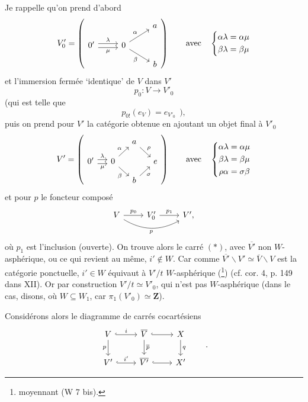 \documentclass[11pt]{article}
\newcommand{\printedpage}[1]{\marginpar{\footnotesize p.~#1}}
\newcommand{\msp}[1]{\marginpar{\footnotesize [#1]}}
\begin{document}
Je rappelle qu'on prend d'abord
\printedpage{11}
\[
V'_0 = \left(
\begin{tikzcd}[row sep=small]
 & & a \\
0' \arrow[r, shift left, "\lambda"] \arrow[r, shift right, "\mu"'] & 0 \arrow[ur, "\alpha"] \arrow[dr, "\beta"'] & \\
 & & b
\end{tikzcd}
\right)
\qquad \text{avec} \quad
\left\{
\begin{aligned}
\alpha\lambda &= \alpha\mu \\
\beta\lambda &= \beta\mu
\end{aligned}
\right.
\]
et l'immersion fermée ‘identique’ de $V$ dans $V'$
\[ p_0 : V \longrightarrow V'_0 \]
\msp{page 15}(qui est telle que
\[ p_{0!}(e_V) = e_{V'_0} \ \ ), \]
puis on prend pour $V'$ la catégorie obtenue en ajoutant un objet final à $V'_0$
\[
V' = \left(
\begin{tikzcd}[row sep=small, column sep=small]
 & & a \arrow[dr, "\rho"] & \\
0' \arrow[r, shift left, "\lambda"] \arrow[r, shift right, "\mu"'] & 0 \arrow[ur, "\alpha"] \arrow[dr, "\beta"'] & & e \\
 & & b \arrow[ur, "\sigma"'] &
\end{tikzcd}
\right)
\qquad \text{avec} \quad
\left\{
\begin{aligned}
\alpha\lambda &= \alpha\mu \\
\beta\lambda &= \beta\mu \\
\rho\alpha &= \sigma\beta
\end{aligned}
\right.
\]
et pour $p$ le foncteur composé
\[
\begin{tikzcd}
V \arrow[r, "p_0"] \arrow[rr, bend right, "p"'] & V'_0 \arrow[r, "p_1"] & V',
\end{tikzcd}
\]
où $p_1$ est l'inclusion (ouverte). On trouve alors le carré $(*)$, avec $\overline{V'}$ non $W$-asphérique, ou ce qui revient au même, $i' \notin W$. Car comme $\overline{V'}\backslash V' \simeq \overline{V}\backslash V$ est la catégorie ponctuelle, $i' \in W$ équivaut à $V'/t$ $W$-asphérique (\footnote[8]{moyennant (W 7 bis).}) (cf. cor. 4, p. 149 dans XII). Or par construction $V'/t \simeq V'_0$, qui n'est pas $W$-asphérique (dans le cas, disons, où $W \subseteq W_1$, car $\pi_1(V'_0) \simeq \mathbf{Z}$).

\msp{page 16}Considérons alors le diagramme de carrés cocartésiens
\[
\begin{tikzcd}
V \arrow[r, hook, "i"] \arrow[d, "p"'] & \overline{V} \arrow[r, hook] \arrow[d, "\overline{p}"] & X \arrow[d, "q"] \\
V' \arrow[r, hook, "i'"] & \overline{V'} \arrow[r, hook] & X'
\end{tikzcd}
\qquad .
\]
\end{document}
